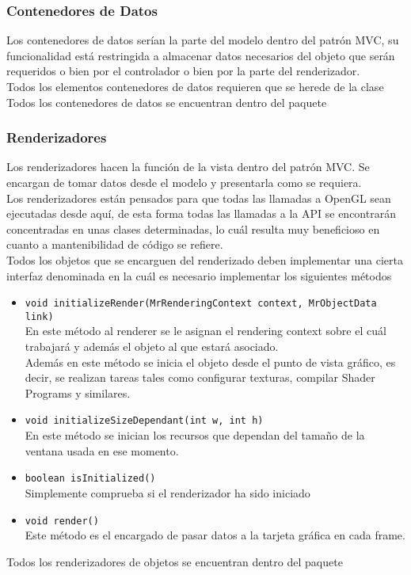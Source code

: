 \subsubsection{Contenedores de Datos}
Los contenedores de datos serían la parte del modelo dentro del patrón MVC, su funcionalidad está restringida a almacenar datos necesarios del objeto que serán requeridos o bien por el controlador o bien por la parte del renderizador.\\
Todos los elementos contenedores de datos requieren que se herede de la clase \rorefobjectdata\\
Todos los contenedores de datos se encuentran dentro del paquete 
\subsubsection{Renderizadores}
Los renderizadores hacen la función de la vista dentro del patrón MVC. Se encargan de tomar datos desde el modelo y presentarla como se requiera.\\
Los renderizadores están pensados para que todas las llamadas a OpenGL sean ejecutadas desde aquí, de esta forma todas las llamadas a la API se encontrarán concentradas en unas clases determinadas, lo cuál resulta muy beneficioso en cuanto a mantenibilidad de código se refiere.\\
Todos los objetos que se encarguen del renderizado deben implementar una cierta interfaz denominada \rorefobjectrender en la cuál es necesario implementar los siguientes métodos

\begin{itemize}
\item \texttt{void initializeRender(MrRenderingContext context, MrObjectData link)}\\
En este método al renderer se le asignan el rendering context sobre el cuál trabajará y además el objeto al que estará asociado.\\ 
Además en este método se inicia el objeto desde el punto de vista gráfico, es decir, se realizan tareas tales como configurar texturas, compilar Shader Programs y similares.
\item \texttt{void initializeSizeDependant(int w, int h)}\\
En este método se inician los recursos que dependan del tamaño de la ventana usada en ese momento.
\item \texttt{boolean isInitialized()}\\
Simplemente comprueba si el renderizador ha sido iniciado
\item \texttt{void render()}\\
Este método es el encargado de pasar datos a la tarjeta gráfica en cada frame.
\end{itemize}
Todos los renderizadores de objetos se encuentran dentro del paquete 
